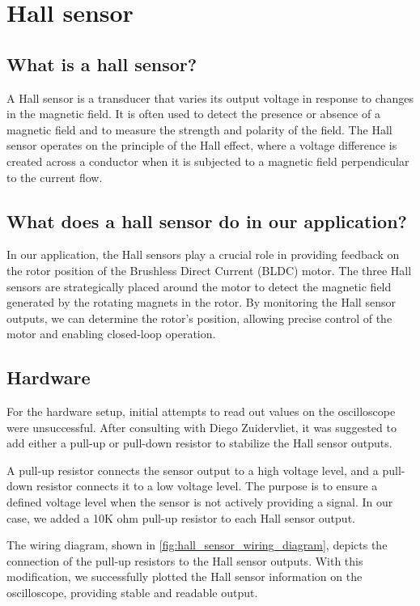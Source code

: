 \section{Hall sensor}\label{section:hallsensor}
\subsection{What is a hall sensor?}
A Hall sensor is a transducer that varies its output voltage in response to changes in the magnetic field. It is often used to detect the presence or absence of a magnetic field and to measure the strength and polarity of the field. The Hall sensor operates on the principle of the Hall effect, where a voltage difference is created across a conductor when it is subjected to a magnetic field perpendicular to the current flow.\cite{9568879}

\subsection{What does a hall sensor do in our application?}
In our application, the Hall sensors play a crucial role in providing feedback on the rotor position of the Brushless Direct Current (BLDC) motor. The three Hall sensors are strategically placed around the motor to detect the magnetic field generated by the rotating magnets in the rotor. By monitoring the Hall sensor outputs, we can determine the rotor's position, allowing precise control of the motor and enabling closed-loop operation.\cite{7489411}

\subsection{Hardware}
For the hardware setup, initial attempts to read out values on the oscilloscope were unsuccessful. After consulting with Diego Zuidervliet\cite{zuidervliet2024}, it was suggested to add either a pull-up or pull-down resistor to stabilize the Hall sensor outputs.

A pull-up resistor connects the sensor output to a high voltage level, and a pull-down resistor connects it to a low voltage level. The purpose is to ensure a defined voltage level when the sensor is not actively providing a signal. In our case, we added a 10K ohm pull-up resistor to each Hall sensor output.

The wiring diagram, shown in \autoref{fig:hall_sensor_wiring_diagram}, depicts the connection of the pull-up resistors to the Hall sensor outputs. With this modification, we successfully plotted the Hall sensor information on the oscilloscope, providing stable and readable output.


